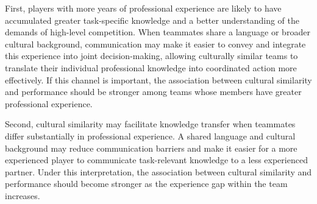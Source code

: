 \documentclass[10pt]{article}
\begin{document}



First, players with more years of professional experience are likely to have accumulated greater task-specific knowledge and a better understanding of the demands of high-level competition. When teammates share a language or broader cultural background, communication may make it easier to convey and integrate this experience into joint decision-making, allowing culturally similar teams to translate their individual professional knowledge into coordinated action more effectively. If this channel is important, the association between cultural similarity and performance should be stronger among teams whose members have greater professional experience. 

Second, cultural similarity may facilitate knowledge transfer when teammates differ substantially in professional experience. A shared language and cultural background may reduce communication barriers and make it easier for a more experienced player to communicate task-relevant knowledge to a less experienced partner. Under this interpretation, the association between cultural similarity and performance should become stronger as the experience gap within the team increases. %
\end{document}
